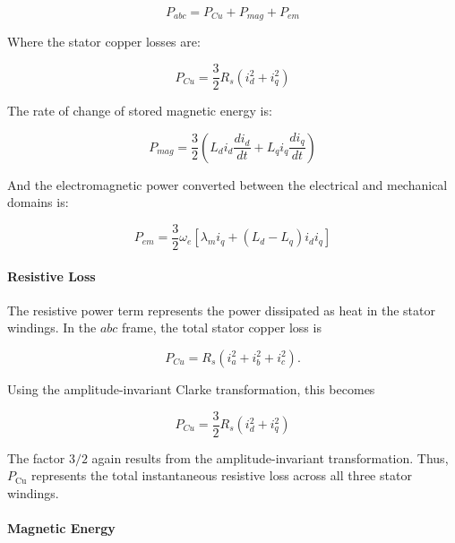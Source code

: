 \documentclass{article}
\begin{document}
\begin{equation}
    P_{abc} = P_{Cu} + P_{mag} + P_{em}
\end{equation}

Where the stator copper losses are:

\begin{equation}
    P_{Cu} = \frac{3}{2}R_s(i_d^2+i_q^2)
\end{equation}

The rate of change of stored magnetic energy is:

\begin{equation}
    P_{mag} = \frac{3}{2}
    \left(
    L_d i_d\frac{di_d}{dt} + L_q i_q\frac{di_q}{dt}
    \right)
\end{equation}

And the electromagnetic power converted between the electrical and mechanical domains is:

\begin{equation}
    P_{em} = \frac{3}{2}\omega_e
    \left[
    \lambda_m i_q + (L_d-L_q)i_d i_q
    \right]
\end{equation}


\paragraph{Resistive Loss}


The resistive power term represents the power dissipated as heat in the
stator windings. In the $abc$ frame, the total stator copper loss is

\begin{equation}
P_{Cu}
=
R_s(i_a^2+i_b^2+i_c^2).
\end{equation}

Using the amplitude-invariant Clarke transformation, this becomes

\begin{equation}
P_{Cu}
=
\frac{3}{2}R_s(i_d^2+i_q^2)
\end{equation}

The factor $3/2$ again results from the amplitude-invariant transformation. Thus, $P_{\mathrm{Cu}}$ represents the total instantaneous resistive loss across all three stator windings.


\paragraph{Magnetic Energy}
\end{document}
